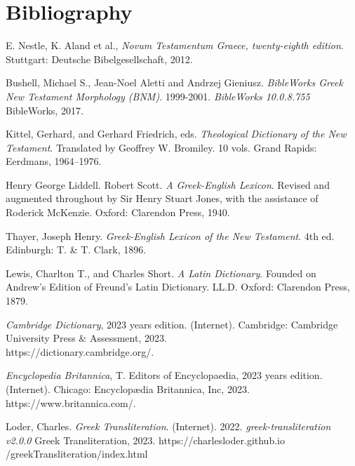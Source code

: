 \documentclass[a4paper,twocolumn,twoside,notitlepage,10pt]{article}
\begin{document}
\section{Bibliography}
\begin{description}
	\item E. Nestle, K. Aland et al., \emph{Novum Testamentum Graece, twenty-eighth edition}. Stuttgart: Deutsche Bibelgesellschaft, 2012.
	\item Bushell, Michael S., Jean-Noel Aletti and Andrzej Gieniusz. \emph{BibleWorks Greek New Testament Morphology (BNM)}. 1999-2001. \emph{BibleWorks 10.0.8.755} BibleWorks, 2017.
	\item Kittel, Gerhard, and Gerhard Friedrich, eds. \emph{Theological Dictionary of the New Testament}. Translated by Geoffrey W. Bromiley. 10 vols. Grand Rapids: Eerdmans, 1964--1976.
	\item Henry George Liddell. Robert Scott.  \emph{A Greek-English Lexicon}. Revised and augmented throughout by Sir Henry Stuart Jones, with the assistance of Roderick McKenzie. Oxford: Clarendon Press, 1940.
	\item Thayer, Joseph Henry. \emph{Greek-English Lexicon of the New Testament}. 4th ed. Edinburgh: T. \& T. Clark, 1896.
	\item Lewis, Charlton T., and Charles Short. \emph{A Latin Dictionary}. Founded on Andrew's Edition of Freund's Latin Dictionary. LL.D. Oxford: Clarendon Press, 1879.
	\item \emph{Cambridge Dictionary}, 2023 years edition. (Internet). Cambridge: Cambridge University Press \& Assessment, 2023.\\ https://dictionary.cambridge.org/.
	\item \emph{Encyclopedia Britannica}, T. Editors of Encyclopaedia, 2023 years edition. (Internet). Chicago: Encyclopædia Britannica, Inc, 2023.\\https://www.britannica.com/.
	\item Loder, Charles. \emph{Greek Transliteration}. (Internet). 2022. \emph{greek-transliteration v2.0.0} Greek Transliteration, 2023. https://charlesloder.github.io\\/greekTransliteration/index.html
\end{description}
\end{document}

